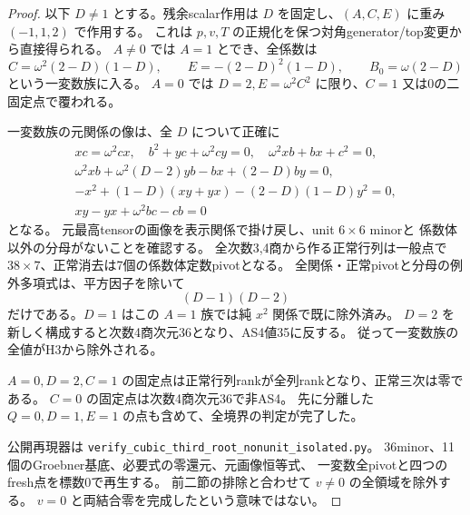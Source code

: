 \begin{proof}
以下 $D\ne1$ とする。残余scalar作用は $D$ を固定し、$(A,C,E)$ に重み $(-1,1,2)$ で作用する。
これは $p,v,T$ の正規化を保つ対角generator/top変更から直接得られる。
$A\ne0$ では $A=1$ とでき、全係数は
\[
 C=\omega^2(2-D)(1-D),\qquad
 E=-(2-D)^2(1-D),\qquad B_0=\omega(2-D)
\]
という一変数族に入る。
$A=0$ では $D=2,E=\omega^2C^2$ に限り、$C=1$ 又は0の二固定点で覆われる。

一変数族の元関係の像は、全 $D$ について正確に
\begin{gather*}
 xc=\omega^2cx,\quad b^2+yc+\omega^2cy=0,\quad
 \omega^2xb+bx+c^2=0,\\
 \omega^2xb+\omega^2(D-2)yb-bx+(2-D)by=0,\\
 -x^2+(1-D)(xy+yx)-(2-D)(1-D)y^2=0,\\
 xy-yx+\omega^2bc-cb=0
\end{gather*}
となる。
元最高tensorの画像を表示関係で掛け戻し、unit $6\times6$ minorと
係数体以外の分母がないことを確認する。
全次数3,4商から作る正常行列は一般点で $38\times7$、正常消去は7個の係数体定数pivotとなる。
全関係・正常pivotと分母の例外多項式は、平方因子を除いて
\[
 (D-1)(D-2)
\]
だけである。$D=1$ はこの $A=1$ 族では純 $x^2$ 関係で既に除外済み。
$D=2$ を新しく構成すると次数4商次元36となり、AS4値35に反する。
従って一変数族の全値がH3から除外される。

$A=0,D=2,C=1$ の固定点は正常行列rankが全列rankとなり、正常三次は零である。
$C=0$ の固定点は次数4商次元36で非AS4。
先に分離した $Q=0,D=1,E=1$ の点も含めて、全境界の判定が完了した。

公開再現器は \texttt{verify\_cubic\_third\_root\_nonunit\_isolated.py}。
36minor、11個のGroebner基底、必要式の零還元、元画像恒等式、
一変数全pivotと四つのfresh点を標数0で再生する。
前二節の排除と合わせて $v\ne0$ の全領域を除外する。
$v=0$ と両結合零を完成したという意味ではない。
\end{proof}

